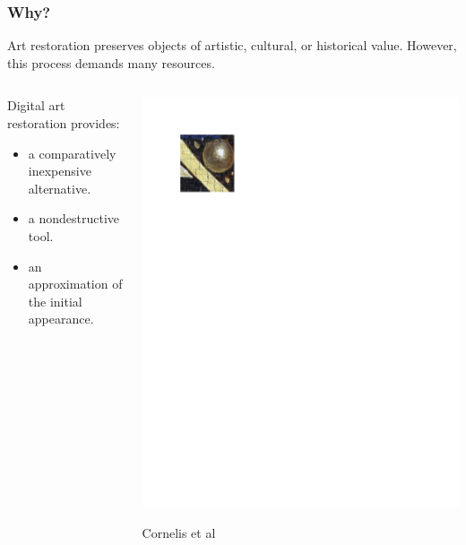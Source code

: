 \documentclass{beamer}
\begin{document}
\begin{frame}
\frametitle{Why?}
Art restoration preserves objects of artistic, cultural, or historical value.
\linebreak
However, this process demands many resources.
\begin{columns}
\begin{column}{0.5\textwidth}
Digital art restoration provides:
\begin{itemize}
\item a comparatively inexpensive alternative.
\item a nondestructive tool.
\item an approximation of the initial appearance.
\end{itemize}
\end{column}
\begin{column}{0.5\textwidth}
\includegraphics[width=1\textwidth,trim={0.5in 8.4in 5.5in 0.75in},clip]{ghent_altarpiece_original}
\begin{center}
\tiny Cornelis et al
\end{center}
\end{column}
\end{columns}
\end{frame}
\end{document}

